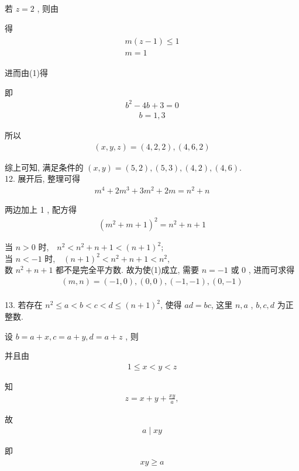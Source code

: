 若 $z=2$ , 则由

得
\begin{align*}
	\begin{gathered}
		m(z-1) \leqslant 1 \\
		m=1
	\end{gathered}
\end{align*}

进而由(1)得

即
\begin{align*}
	b^{2}-4 b+3=0
\end{align*}
\begin{align*}
	b=1,3
\end{align*}

所以
\begin{align*}
	(x, y, z)=(4,2,2),(4,6,2)
\end{align*}

综上可知, 满足条件的 $(x, y)=(5,2),(5,3),(4,2),(4,6)$.\\
12. 展开后, 整理可得
\begin{align*}
	m^{4}+2 m^{3}+3 m^{2}+2 m=n^{2}+n
\end{align*}

两边加上 1 , 配方得
\begin{align*}
	\left(m^{2}+m+1\right)^{2}=n^{2}+n+1
\end{align*}

当 $n>0$ 时,$\quad n^{2}<n^{2}+n+1<(n+1)^{2}$;\\
当 $n<-1$ 时,$\quad(n+1)^{2}<n^{2}+n+1<n^{2}$,\\
数 $n^{2}+n+1$ 都不是完全平方数. 故为使(1)成立, 需要 $n=-1$ 或 0 , 进而可求得
\begin{align*}
	(m, n)=(-1,0),(0,0),(-1,-1),(0,-1)
\end{align*}\\
13. 若存在 $n^{2} \leqslant a<b<c<d \leqslant(n+1)^{2}$, 使得 $a d=b c$, 这里 $n ,  a$ ,  $b ,  c ,  d$ 为正整数.

设 $b=a+x, c=a+y, d=a+z$ , 则

并且由
\begin{align*}
	1 \leqslant x<y<z
\end{align*}

知
\begin{align*}
	z=x+y+\frac{x y}{a},
\end{align*}

故
\begin{align*}
	a \mid x y
\end{align*}

即
\begin{align*}
	x y \geqslant a
\end{align*}

